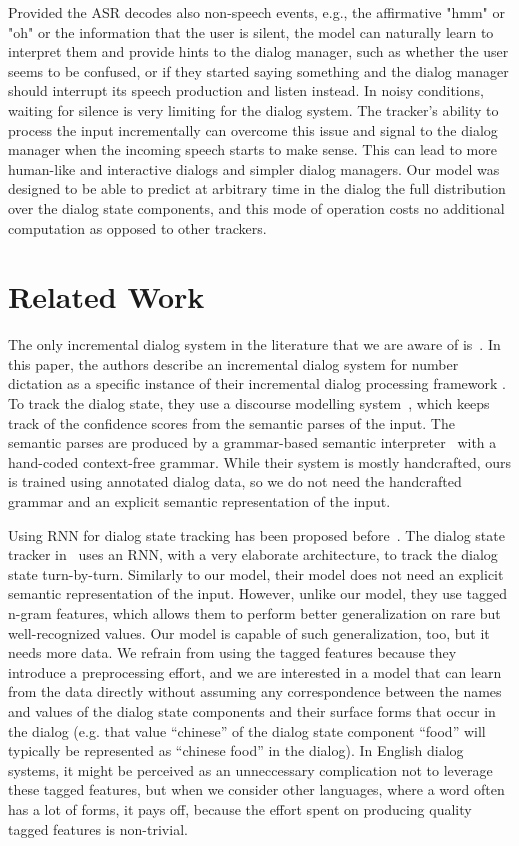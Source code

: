 \documentclass[10pt,twocolumn]{article}
\begin{document}
Provided the ASR decodes also non-speech events, e.g., the affirmative "hmm" or "oh" or the information that the user is silent, the model can naturally learn to interpret them and provide hints to the dialog manager, such as whether the user seems to be confused, or if they started saying something and the dialog manager should interrupt its speech production and listen instead. In noisy conditions, waiting for silence is very limiting for the dialog system. The tracker's ability to process the input incrementally can overcome this issue and signal to the dialog manager when the incoming speech starts to make sense. This can lead to more human-like and interactive dialogs and simpler dialog managers. Our model was designed to be able to predict at arbitrary time in the dialog the full distribution over the dialog state components, and this mode of operation costs no additional computation as opposed to other trackers.

\section{Related Work}
\label{sec:related}

The only incremental dialog system in the literature that we are aware of is~\cite{skantze2009incremental}. In this paper, the authors describe an incremental dialog system for number dictation as a specific instance of their incremental dialog processing framework \cite{schlangen2009general}. To track the dialog state, they use a discourse modelling system~\cite{skantze2008galatea}, which keeps track of the confidence scores from the semantic parses of the input. The semantic parses are produced by a grammar-based semantic interpreter~\cite{skantze2004robust} with a hand-coded context-free grammar. While their system is mostly handcrafted, ours is trained using annotated dialog data, so we do not need the handcrafted grammar and an explicit semantic representation of the input.

Using RNN for dialog state tracking has been proposed before~\cite{henderson2014word,henderson2013deep}. The dialog state tracker in~\cite{henderson2014word} uses an RNN, with a very elaborate architecture, to track the dialog state turn-by-turn. Similarly to our model, their model does not need an explicit semantic representation of the input. However, unlike our model, they use tagged n-gram features, which allows them to perform better generalization on rare but well-recognized values. Our model is capable of such generalization, too, but it needs more data. We refrain from using the tagged features because they introduce a preprocessing effort, and we are interested in a model that can learn from the data directly without assuming any correspondence between the names and values of the dialog state components and their surface forms that occur in the dialog (e.g. that value ``chinese'' of the dialog state component ``food'' will typically be represented as ``chinese food'' in the dialog). In English dialog systems, it might be perceived as an unneccessary complication not to leverage these tagged features, but when we consider other languages, where a word often has a lot of forms, it pays off, because the effort spent on producing quality tagged features is non-trivial.
\end{document}
